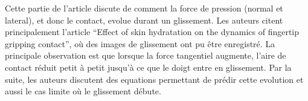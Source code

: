 \documentclass[../main.tex]{subfiles}
\begin{document}
Cette partie de l'article discute de comment la force de pression (normal et lateral), et donc le contact, evolue durant un glissement. 
Les auteurs citent principalement l'article ``Effect of skin hydratation on the dynamics of fingertip gripping contact'',
où des images de glissement ont pu être enregistr\'e.
La principale observation est que lorsque la force tangentiel augmente, l'aire de contact r\'eduit petit à petit jusqu'à ce que le doigt entre en glissement.
Par la suite, les auteurs discutent des equations permettant de pr\'edir cette evolution et aussi le cas limite où le glissement d\'ebute.
\end{document}
